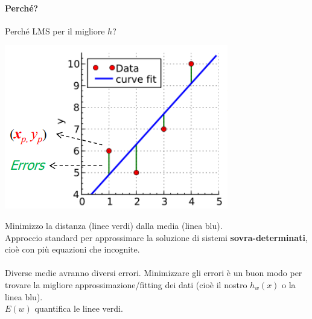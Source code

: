 \documentclass[10pt]{book}
\begin{document}
\paragraph{Perché?} Perché LMS per il migliore $h$?
\begin{multicols}{2}
\begin{center}
	\includegraphics[scale=0.7]{ml_lms.png}
\end{center}
Minimizzo la distanza (linee verdi) dalla media (linea blu).\\
Approccio standard per approssimare la soluzione di sistemi \textbf{sovra-determinati}, cioè con più equazioni che incognite.\\\\
Diverse medie avranno diversi errori. Minimizzare gli errori è un buon modo per trovare la migliore approssimazione/fitting dei dati (cioè il nostro $h_w(x)$ o la linea blu).\\
$E(w)$ quantifica le linee verdi.
\end{multicols}
\end{document}
